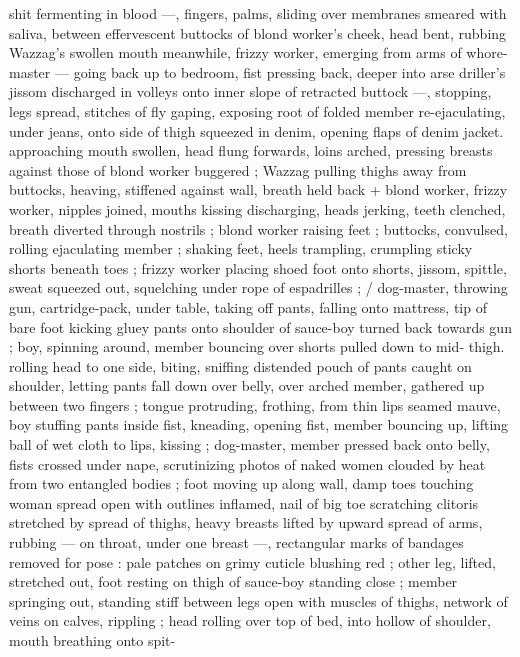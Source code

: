 shit fermenting in blood ---, fingers, palms, sliding over membranes 
smeared with saliva, between effervescent buttocks of blond 
worker's cheek, head bent, rubbing Wazzag's swollen mouth 
meanwhile, frizzy worker, emerging from arms of whore-master --- 
going back up to bedroom, fist pressing back, deeper into arse 
driller's jissom discharged in volleys onto inner slope of retracted 
buttock ---, stopping, legs spread, stitches of fly gaping, exposing 
root of folded member re-ejaculating, under jeans, onto side of thigh 
squeezed in denim, opening flaps of denim jacket. approaching 
mouth swollen, head flung forwards, loins arched, pressing breasts 
against those of blond worker buggered ; Wazzag pulling thighs 
away from buttocks, heaving, stiffened against wall, breath held back 
+ blond worker, frizzy worker, nipples joined, mouths kissing 
discharging, heads jerking, teeth clenched, breath diverted through 
nostrils ; blond worker raising feet ; buttocks, convulsed, rolling 
ejaculating member ; shaking feet, heels trampling, crumpling sticky 
shorts beneath toes ; frizzy worker placing shoed foot onto shorts, 
jissom, spittle, sweat squeezed out, squelching under rope of 
espadrilles ; {\slash} dog-master, throwing gun, cartridge-pack, under table, 
taking off pants, falling onto mattress, tip of bare foot kicking gluey 
pants onto shoulder of sauce-boy turned back towards gun ; boy, 
spinning around, member bouncing over shorts pulled down to mid- 
thigh. rolling head to one side, biting, sniffing distended pouch of 
pants caught on shoulder, letting pants fall down over belly, over 
arched member, gathered up between two fingers ; tongue 
protruding, frothing, from thin lips seamed mauve, boy stuffing pants 
inside fist, kneading, opening fist, member bouncing up, lifting ball 
of wet cloth to lips, kissing ; dog-master, member pressed back onto 
belly, fists crossed under nape, scrutinizing photos of naked women 
clouded by heat from two entangled bodies ; foot moving up along 
wall, damp toes touching woman spread open with outlines inflamed, 
nail of big toe scratching clitoris stretched by spread of thighs, 
heavy breasts lifted by upward spread of arms, rubbing --- on throat, 
under one breast ---, rectangular marks of bandages removed for 
pose : pale patches on grimy cuticle blushing red ; other leg, lifted, 
stretched out, foot resting on thigh of sauce-boy standing close ; 
member springing out, standing stiff between legs open with 
muscles of thighs, network of veins on calves, rippling ; head rolling 
over top of bed, into hollow of shoulder, mouth breathing onto spit- 
